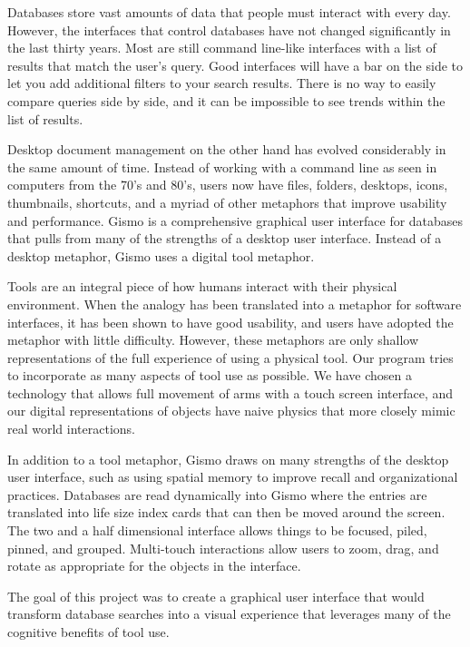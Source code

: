 \documentclass{article}
\begin{document}
Databases store vast amounts of data that people must interact with every day.  However, the interfaces that control databases have not changed significantly in the last thirty years.  Most are still command line-like  interfaces with a list of results that match the user's query.  Good interfaces will have a bar on the side to let you add additional filters to your search results.  There is no way to easily compare queries side by side, and it can be impossible to see trends within the list of results.

Desktop document management on the other hand has evolved considerably in the same amount of time.  Instead of working with a command line as seen in computers from the 70's and 80's, users now have files, folders, desktops, icons, thumbnails, shortcuts, and a myriad of other metaphors that improve usability and performance.   Gismo is a comprehensive graphical user interface for databases that pulls from many of the strengths of a desktop user interface. Instead of a desktop metaphor, Gismo uses a digital tool metaphor.

Tools are an integral piece of how humans interact with their physical environment.  When the analogy has been translated into a metaphor for software interfaces, it has been shown to have good usability, and users have adopted the metaphor with little difficulty.  However, these metaphors are only shallow representations of the full experience of using a physical tool.  Our program tries to incorporate as many aspects of tool use as possible.  We have chosen a technology that allows full movement of arms with a touch screen interface, and our digital representations of objects have naive physics that more closely mimic real world interactions.

In addition to a tool metaphor, Gismo draws on many strengths of the desktop user interface, such as using spatial memory to improve recall and organizational practices.  Databases are read dynamically into Gismo where the entries are translated into life size index cards that can then be moved around the screen.  The two and a half dimensional interface allows things to be focused, piled, pinned, and grouped.  Multi-touch interactions allow users to zoom, drag, and rotate as appropriate for the objects in the interface. 


The goal of this project was to create a graphical user interface that would transform database searches into a visual experience that leverages many of the cognitive benefits of tool use.
\end{document}
